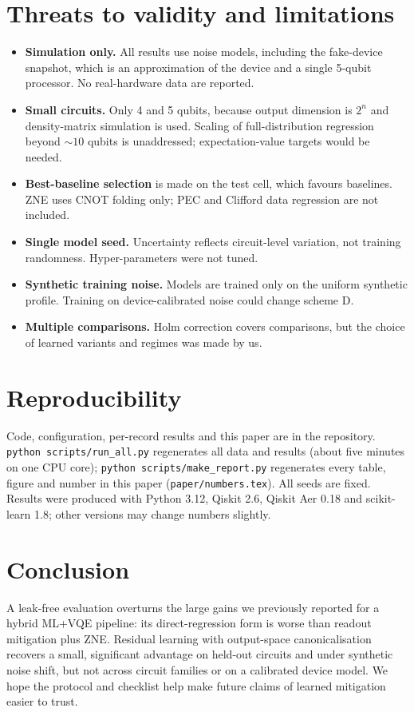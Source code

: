 \documentclass[11pt]{article}
\begin{document}
\section{Threats to validity and limitations}
\begin{itemize}
\item \textbf{Simulation only.} All results use noise models, including the fake-device snapshot, which is an approximation of the device and a single 5-qubit processor. No real-hardware data are reported.
\item \textbf{Small circuits.} Only 4 and 5 qubits, because output dimension is $2^n$ and density-matrix simulation is used. Scaling of full-distribution regression beyond $\sim 10$ qubits is unaddressed; expectation-value targets would be needed.
\item \textbf{Best-baseline selection} is made on the test cell, which favours baselines. ZNE uses CNOT folding only; PEC and Clifford data regression are not included.
\item \textbf{Single model seed.} Uncertainty reflects circuit-level variation, not training randomness. Hyper-parameters were not tuned.
\item \textbf{Synthetic training noise.} Models are trained only on the uniform synthetic profile. Training on device-calibrated noise could change scheme D.
\item \textbf{Multiple comparisons.} Holm correction covers \ntests{} comparisons, but the choice of learned variants and regimes was made by us.
\end{itemize}

\section{Reproducibility}
Code, configuration, per-record results and this paper are in the repository. \texttt{python scripts/run\_all.py} regenerates all data and results (about five minutes on one CPU core); \texttt{python scripts/make\_report.py} regenerates every table, figure and number in this paper (\texttt{paper/numbers.tex}). All seeds are fixed. Results were produced with Python 3.12, Qiskit 2.6, Qiskit Aer 0.18 and scikit-learn 1.8; other versions may change numbers slightly.

\section{Conclusion}
A leak-free evaluation overturns the large gains we previously reported for a hybrid ML+VQE pipeline: its direct-regression form is worse than readout mitigation plus ZNE. Residual learning with output-space canonicalisation recovers a small, significant advantage on held-out circuits and under synthetic noise shift, but not across circuit families or on a calibrated device model. We hope the protocol and checklist help make future claims of learned mitigation easier to trust.
\end{document}
